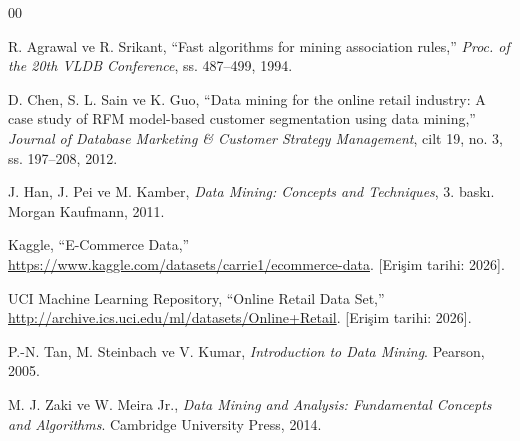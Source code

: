 \documentclass[conference]{IEEEtran}
\begin{document}
\begin{thebibliography}{00}

 R. Agrawal ve R. Srikant, ``Fast algorithms for mining association rules,'' \textit{Proc. of the 20th VLDB Conference}, ss. 487--499, 1994.

 D. Chen, S. L. Sain ve K. Guo, ``Data mining for the online retail industry: A case study of RFM model-based customer segmentation using data mining,'' \textit{Journal of Database Marketing \& Customer Strategy Management}, cilt 19, no. 3, ss. 197--208, 2012.

 J. Han, J. Pei ve M. Kamber, \textit{Data Mining: Concepts and Techniques}, 3. baskı. Morgan Kaufmann, 2011.

 Kaggle, ``E-Commerce Data,'' \url{https://www.kaggle.com/datasets/carrie1/ecommerce-data}. [Erişim tarihi: 2026].

 UCI Machine Learning Repository, ``Online Retail Data Set,'' \url{http://archive.ics.uci.edu/ml/datasets/Online+Retail}. [Erişim tarihi: 2026].

 P.-N. Tan, M. Steinbach ve V. Kumar, \textit{Introduction to Data Mining}. Pearson, 2005.

 M. J. Zaki ve W. Meira Jr., \textit{Data Mining and Analysis: Fundamental Concepts and Algorithms}. Cambridge University Press, 2014.

\end{thebibliography}
\end{document}
